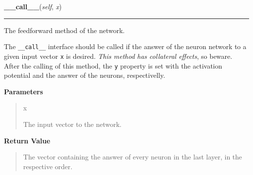     \begin{boxedminipage}{\textwidth}

    \raggedright \textbf{\_\_call\_\_}(\textit{self}, \textit{x})

    \vspace{-1.5ex}

    \rule{\textwidth}{0.5\fboxrule}

The feedforward method of the network.

The \texttt{{\_}{\_}call{\_}{\_}} interface should be called if the answer of the neuron
network to a given input vector \texttt{x} is desired. \emph{This method has
collateral effects}, so beware. After the calling of this method, the
\texttt{y} property is set with the activation potential and the answer of
the neurons, respectivelly.
    \vspace{1ex}

      \textbf{Parameters}
      \begin{quote}
        \begin{Ventry}{x}

          \item[x]


The input vector to the network.
        \end{Ventry}

      \end{quote}

    \vspace{1ex}

      \textbf{Return Value}
      \begin{quote}

The vector containing the answer of every neuron in the last layer, in
the respective order.
      \end{quote}

    \vspace{1ex}

    \end{boxedminipage}

    \label{peach:nn:nn:FeedForward:learn}

    \vspace{0.5ex}

